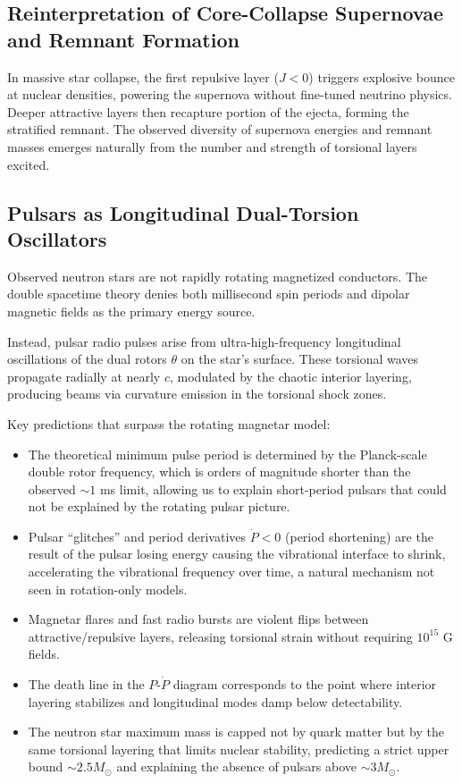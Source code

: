 \documentclass[dvipdfmx,a4paper]{article}
\begin{document}
\subsection{Reinterpretation of Core-Collapse Supernovae and Remnant Formation}

In massive star collapse, the first repulsive layer ($J < 0$) triggers explosive bounce at nuclear densities, powering the supernova without fine-tuned neutrino physics. Deeper attractive layers then recapture portion of the ejecta, forming the stratified remnant. The observed diversity of supernova energies and remnant masses emerges naturally from the number and strength of torsional layers excited.

\subsection{Pulsars as Longitudinal Dual-Torsion Oscillators}

Observed neutron stars are not rapidly rotating magnetized conductors. The double spacetime theory denies both millisecond spin periods and dipolar magnetic fields as the primary energy source.

Instead, pulsar radio pulses arise from ultra-high-frequency longitudinal oscillations of the dual rotors $\theta$ on the star's surface. These torsional waves propagate radially at nearly $c$, modulated by the chaotic interior layering, producing beams via curvature emission in the torsional shock zones.

Key predictions that surpass the rotating magnetar model:
\begin{itemize}
\item The theoretical minimum pulse period is determined by the Planck-scale double rotor frequency, which is orders of magnitude shorter than the observed $\sim 1$ ms limit, allowing us to explain short-period pulsars that could not be explained by the rotating pulsar picture.
\item Pulsar ``glitches'' and period derivatives $\dot{P} < 0$ (period shortening) are the result of the pulsar losing energy causing the vibrational interface to shrink, accelerating the vibrational frequency over time, a natural mechanism not seen in rotation-only models.
\item Magnetar flares and fast radio bursts are violent flips between attractive/repulsive layers, releasing torsional strain without requiring $10^{15}$ G fields.
\item The death line in the $P$-$\dot{P}$ diagram corresponds to the point where interior layering stabilizes and longitudinal modes damp below detectability.
\item The neutron star maximum mass is capped not by quark matter but by the same torsional layering that limits nuclear stability, predicting a strict upper bound $\sim 2.5 M_\odot$ and explaining the absence of pulsars above $\sim 3 M_\odot$.
\end{itemize}
\end{document}
